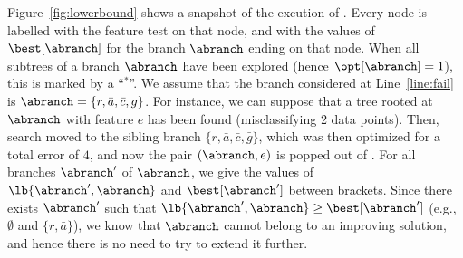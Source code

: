 \documentclass{llncs}
\begin{document}
\begin{example}
	\label{ex:lb}
	
	Figure~\ref{fig:lowerbound} shows a snapshot of the excution of \budalg. Every node is labelled with the feature test on that node, and with the values of $\best[\abranch]$ for the branch $\abranch$ ending on that node. When all subtrees of a branch $\abranch$ have been explored (hence $\opt[\abranch]=1$), this is marked by a ``$^*$''. We assume that the branch considered at Line~\ref{line:fail} is $\abranch = \{r, \bar{a}, \bar{c}, g\}$. For instance, we can suppose that a tree rooted at $\abranch$ with feature $e$ has been found (misclassifying 2 data points). Then, search moved to the sibling branch $\{r, \bar{a}, \bar{c}, \bar{g}\}$, which was then optimized for a total error of $4$, and now the pair $(\abranch,e)$ is popped out of \sequence. For all branches $\abranch'$ of $\abranch$, we give the values of $\lb{\abranch',\abranch}$ and $\best[\abranch']$ between brackets. Since there exists $\abranch'$ such that $\lb{\abranch',\abranch} \geq \best[\abranch']$ (e.g., $\emptyset$ and $\{r, \bar{a}\}$), we know that $\abranch$ cannot belong to an improving solution, and hence there is no need to try to extend it further. 
	



\end{example}
\end{document}
